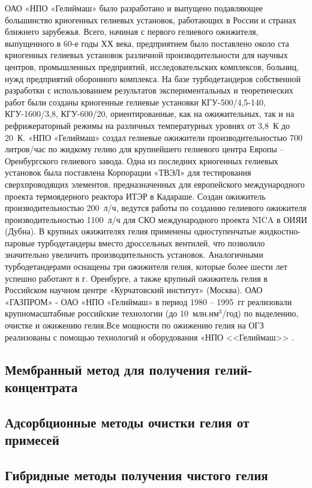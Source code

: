 ОАО «НПО «Гелиймаш» было разработано и выпущено подавляющее большинство криогенных гелиевых установок, работающих в России и странах ближнего зарубежья. Всего, начиная с первого гелиевого ожижителя, выпущенного в 60-е годы ХХ века, предприятием было поставлено около ста криогенных гелиевых установок различной производительности для научных центров, промышленных предприятий, исследовательских комплексов, больниц, нужд предприятий оборонного комплекса. На базе турбодетандеров собственной разработки с использованием результатов экспериментальных и теоретических работ были созданы криогенные гелиевые установки КГУ-500/4,5-140, КГУ-1600/3,8, КГУ-600/20, ориентированные, как на ожижительных, так и на рефрижераторный режимы на различных температурных уровнях от 3,8~К до 20~К. «НПО «Гелиймаш» создал гелиевые ожижители производительностью 700 литров/час по жидкому гелию для крупнейшего гелиевого центра Европы – Оренбургского гелиевого завода. Одна из последних криогенных гелиевых установок была поставлена  Корпорации «ТВЭЛ» для тестирования сверхпроводящих элементов, предназначенных для европейского международного проекта термоядерного реактора ИТЭР в Кадараше. Создан ожижитель производительностью 200~л/ч, ведутся работы по созданию гелиевого ожижителя производительностью 1100~л/ч для СКО международного проекта NICA в ОИЯИ (Дубна). В крупных ожижителях гелия применены одноступенчатые жидкостно-паровые турбодетандеры вместо дроссельных вентилей, что позволило значительно увеличить производительность установок. Аналогичными турбодетандерами оснащены три ожижителя гелия, которые более шести лет успешно работают в г. Оренбурге, а также крупный ожижитель гелия в Российском научном центре «Курчатовский институт» (Москва). ОАО «ГАЗПРОМ» - ОАО «НПО «Гелиймаш» в период 1980 -- 1995~гг реализовали крупномасштабные российские технологии (до 10~млн.нм$^3$/год) по выделению, очистке и ожижению гелия.Все мощности по ожижению гелия на ОГЗ реализованы с помощью технологий и оборудования «НПО <<Гелиймаш>> \cite{GeliyMash_OG-1000}.


\cite{Stepanov_Avtoreferat}

\subsection{Мембранный метод для получения гелий-концентрата} \label{section_1_1_1}

\subsection{Адсорбционные методы очистки гелия от примесей} \label{section_1_1_2}

\subsection{Гибридные методы получения чистого гелия} \label{section_1_1_3}